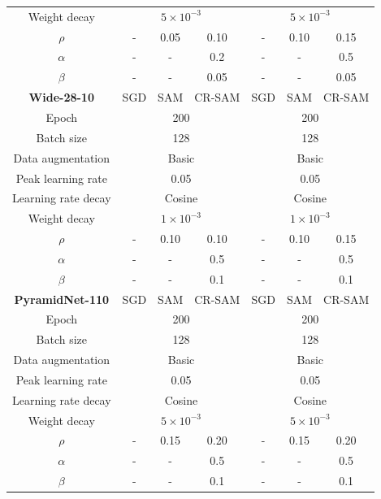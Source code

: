 \documentclass[letterpaper]{article} %
\theoremstyle{plain}
\theoremstyle{definition}
\begin{document}
\begin{table}[h!]
\begin{tabular}{c|ccc|ccc}
   Weight decay &\multicolumn{3}{c|}{$5\times10^{-3}$}&\multicolumn{3}{c}{$5\times10^{-3}$}\\
   $\rho$ & -&0.05&0.10&-&0.10&0.15\\
   $\alpha$ &-&-&0.2&-&-&0.5\\
   $\beta$ &-&-&0.05&-&-&0.05\\
      \midrule
      \textbf{Wide-28-10}   & SGD & SAM &CR-SAM& SGD & SAM &CR-SAM\\
         \midrule
   Epoch&\multicolumn{3}{c|}{200}&\multicolumn{3}{c}{200}\\
   Batch size&\multicolumn{3}{c|}{128}&\multicolumn{3}{c}{128}\\
   Data augmentation &\multicolumn{3}{c|}{Basic}&\multicolumn{3}{c}{Basic}\\
   Peak learning rate &\multicolumn{3}{c|}{0.05}&\multicolumn{3}{c}{0.05}\\
   Learning rate decay &\multicolumn{3}{c|}{Cosine}&\multicolumn{3}{c}{Cosine}\\
   Weight decay &\multicolumn{3}{c|}{$1\times10^{-3}$}&\multicolumn{3}{c}{$1\times10^{-3}$}\\
   $\rho$ & -&0.10&0.10&-&0.10&0.15\\
   $\alpha$ &-&-&0.5&-&-&0.5\\
   $\beta$ &-&-&0.1&-&-&0.1\\
\midrule
      \textbf{PyramidNet-110}   & SGD & SAM &CR-SAM& SGD & SAM &CR-SAM\\
   \midrule
   Epoch&\multicolumn{3}{c|}{200}&\multicolumn{3}{c}{200}\\
   Batch size&\multicolumn{3}{c|}{128}&\multicolumn{3}{c}{128}\\
   Data augmentation &\multicolumn{3}{c|}{Basic}&\multicolumn{3}{c}{Basic}\\
   Peak learning rate &\multicolumn{3}{c|}{0.05}&\multicolumn{3}{c}{0.05}\\
   Learning rate decay &\multicolumn{3}{c|}{Cosine}&\multicolumn{3}{c}{Cosine}\\
   Weight decay &\multicolumn{3}{c|}{$5\times10^{-3}$}&\multicolumn{3}{c}{$5\times10^{-3}$}\\

   $\rho$ & -&0.15&0.20&-&0.15&0.20\\
   $\alpha$ &-&-&0.5&-&-&0.5\\
   $\beta$ &-&-&0.1&-&-&0.1\\
    \bottomrule

  \end{tabular}

  \label{tab:hyper_cifar}
\end{table}
\end{document}
